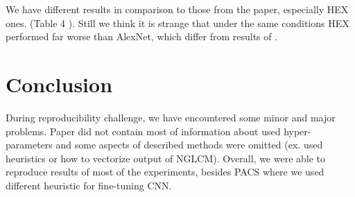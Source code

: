 \documentclass{article} %
\begin{document}
We have different results in comparison to those from the paper, especially HEX ones. (Table 4 \citep{wang2018learning}). 
Still we think it is strange that under the same conditions HEX performed far worse than AlexNet, which differ from results of \citet{wang2018learning}.

\section{Conclusion}

During reproducibility challenge, we have encountered some minor and major problems.
Paper did not contain most of information about used hyper-parameters and some aspects of described
methods were omitted (ex. used heuristics or how to vectorize output of NGLCM). Overall, we were
able to reproduce results of most of the experiments, besides PACS where we used different heuristic
for fine-tuning CNN.

\pagebreak



\end{document}
